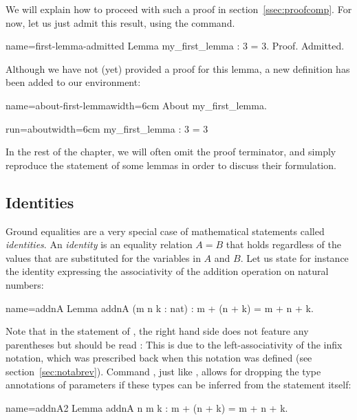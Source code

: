 We will explain how to proceed with such a proof in
section~\ref{ssec:proofcomp}.
For now, let us just admit this result, using the 
command.

\begin{coq}{name=first-lemma-admitted}{}
Lemma my_first_lemma : 3 = 3.
Proof.
Admitted.
\end{coq}

Although we have not (yet) provided a proof for this lemma, a new
definition has been added to our environment:

\begin{coq}{name=about-first-lemma}{width=6cm}
About my_first_lemma.
\end{coq}
\begin{coqout}{run=about}{width=6cm}
my_first_lemma : 3 = 3
\end{coqout}


In the rest of the chapter, we will often omit the  proof
terminator, and simply reproduce the statement of some lemmas in
order to discuss their formulation.

\subsection{Identities}\label{ssec:id}

Ground equalities are a very special case of mathematical
statements called \emph{identities}. An \emph{identity} is an equality
relation $A = B$ that holds regardless of the values that are
substituted for the variables in $A$ and $B$.
Let us state for instance the identity expressing the associativity of
the addition operation on natural numbers:

\begin{coq}{name=addnA}{}
Lemma addnA (m n k : nat) : m + (n + k) = m + n + k.
\end{coq}

Note that in the statement of , the right hand side does not
feature any parentheses but should be read : This
is due to the left-associativity of the infix \C{+} notation, which
was prescribed back when this notation was defined (see
section~\ref{sec:notabrev}). Command
, just like , allows for
dropping the type annotations of parameters if these types can be
inferred from the statement itself:

\begin{coq}{name=addnA2}{}
Lemma addnA n m k : m + (n + k) = m + n + k.
\end{coq}


